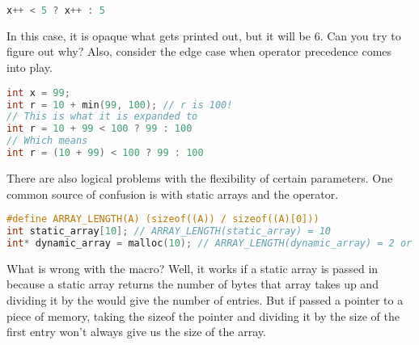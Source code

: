 \begin{lstlisting}[language=C]
x++ < 5 ? x++ : 5
\end{lstlisting}

In this case, it is opaque what gets printed out, but it will be 6.
Can you try to figure out why?
Also, consider the edge case when operator precedence comes into play.

\begin{lstlisting}[language=C]
int x = 99;
int r = 10 + min(99, 100); // r is 100!
// This is what it is expanded to
int r = 10 + 99 < 100 ? 99 : 100
// Which means
int r = (10 + 99) < 100 ? 99 : 100
\end{lstlisting}

There are also logical problems with the flexibility of certain parameters.
One common source of confusion is with static arrays and the  operator.

\begin{lstlisting}[language=C]
#define ARRAY_LENGTH(A) (sizeof((A)) / sizeof((A)[0]))
int static_array[10]; // ARRAY_LENGTH(static_array) = 10
int* dynamic_array = malloc(10); // ARRAY_LENGTH(dynamic_array) = 2 or 1 consistently
\end{lstlisting}

What is wrong with the macro?
Well, it works if a static array is passed in because  a static array returns the number of bytes that array takes up and dividing it by the  would give the number of entries.
But if passed a pointer to a piece of memory, taking the sizeof the pointer and dividing it by the size of the first entry won't always give us the size of the array.
